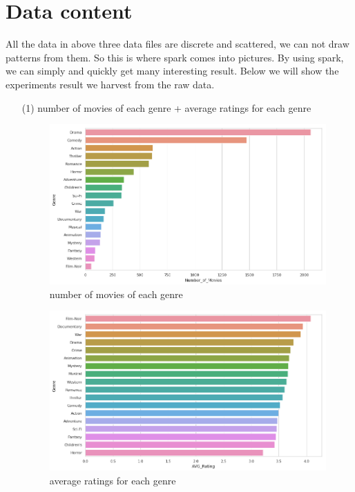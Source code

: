 \documentclass[two column]{article}
\begin{document}
\section{Data content}
\par All the data in above three data files are discrete and scattered, we can not draw patterns from them. So this is where spark comes into pictures. By using spark, we can simply and quickly get many interesting result. Below we will show the experiments result we harvest from the raw data.

\begin{itemize}
\item[(1)] number of movies of each genre + average ratings for each genre

\begin{figure}[H]
\centering
\caption{number of movies of each genre}
\includegraphics[width = 0.95\linewidth]{numbers-according-to-genre2.png}
\end{figure}

\begin{figure}[H]
\centering
\caption{average ratings for each genre}
\includegraphics[width = 0.95\linewidth]{ave-ratings-according-to-genre2.png}
\end{figure}


\end{itemize}
\end{document}
